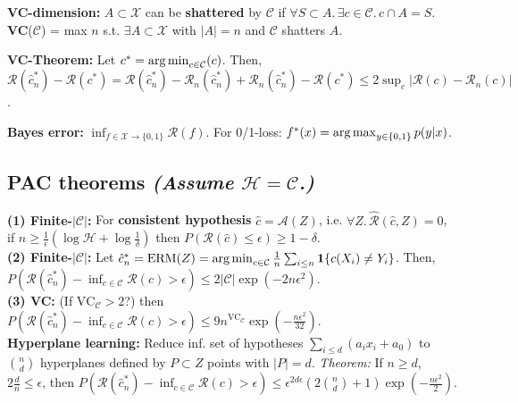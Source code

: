 \textbf{VC-dimension:} $A\subset\mathcal{X}$ can be \textbf{shattered} by $\mathcal{C}$ if $\forall S\subset A.\, \exists c\in\mathcal{C}.\, c\cap A = S$.
\textbf{VC}($\mathcal{C}$) = max $n$ s.t. $\exists A\subset\mathcal{X}$ with $|A|=n$ and $\mathcal{C}$ shatters $A$. 

\textbf{VC-Theorem:} Let $c^* = \operatorname*{arg\,min}_{c\in\mathcal{C}}(c)$. Then, $\mathcal{R}(\hat{c}^*_n) - \mathcal{R}(c^*)  = \mathcal{R}(\hat{c}^*_n) - \mathcal{R}_n(\hat{c}^*_n) + \mathcal{R}_n(\hat{c}^*_n) - \mathcal{R}(c^*) \leq 2\sup_c|\mathcal{R}(c)-\mathcal{R}_n(c)|$.

\textbf{Bayes error:} $\inf_{f\in\mathcal{X}\to\{0,1\}}\mathcal{R}(f)$. For 0/1-loss: $f^*(x) = \operatorname*{arg\,max}_{y\in\{0,1\}}p(y|x)$.

\subsection*{PAC theorems \normalfont \emph{(Assume $\mathcal{H} = \mathcal{C}$.)}}
\textbf{(1) Finite-$|\mathcal{C}|$:} For \textbf{consistent hypothesis} $\hat{c}=\mathcal{A}(Z)$, i.e. $\forall Z.\,\mathcal{\hat{R}}(\hat{c},Z)=0$, if $n\geq \frac{1}{\epsilon}(\log\mathcal{H}+\log\frac{1}{\delta})$ then $P(\mathcal{R}(\hat{c}) \leq \epsilon) \geq 1-\delta$.\\
\textbf{(2) Finite-$|\mathcal{C}|$:} Let $\hat{c}^*_n = \mathrm{ERM}(Z) = \operatorname*{arg\,min}_{c\in\mathcal{C}}\frac{1}{n}\sum_{i\leq n}\mathbf{1}\{c(X_i)\neq Y_i\}$. Then, $P(\mathcal{R}(\hat{c}^*_n) - \inf_{c\in\mathcal{C}}\mathcal{R}(c) > \epsilon) \leq 2|\mathcal{C}|\exp(-2n\epsilon^2)$.\\
\textbf{(3) VC:} (If $\mathrm{VC}_\mathcal{C}>2$?) then 
$P(\mathcal{R}(\hat{c}^*_n) - \inf_{c\in\mathcal{C}}\mathcal{R}(c) > \epsilon) \leq 9n^{\mathrm{VC}_\mathcal{C}}\exp(-\frac{n\epsilon^2}{32})$.\\
\textbf{Hyperplane learning:} Reduce inf. set of hypotheses $\sum_{i\leq d}(a_i x_i + a_0)$ to $\binom{n}{d}$ hyperplanes defined by $P\subset Z$ points with $|P| = d$. \emph{Theorem:} If $n\geq d$, $2\frac{d}{n}\leq\epsilon$, then $P(\mathcal{R}(\hat{c}^*_n)-\inf_{c\in\mathcal{C}}\mathcal{R}(c)>\epsilon) \leq \epsilon^{2d\epsilon}(2\binom{n}{d}+1)\exp(-\frac{n\epsilon^2}{2})$.

